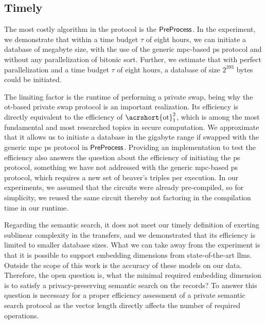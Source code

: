 \subsection*{\thesubsection\quad Timely}\label{subsec:DiscussionTimely}

The most costly algorithm in the protocol is the $ \mathsf{{PreProcess}} $. In the experiment, we demonstrate that within a time budget $ \tau $ of eight hours, we can initiate a database of megabyte size, with the use of the generic \acrshort{mpc}-based \acrshort{ps} protocol and without any parallelization of bitonic sort. Further, we estimate that with perfect parallelization and a time budget $ \tau $ of eight hours, a database of size $ 2^{393} $ bytes could be initiated. 

The limiting factor is the runtime of performing a private swap, being why the \acrshort{ot}-based private swap protocol is an important realization. Its efficiency is directly equivalent to the efficiency of $\text{\acrshort{ot}}^2_1$, which is among the most fundamental and most researched topics in secure computation. We approximate that it allows us to initiate a database in the gigabyte range if swapped with the generic \acrshort{mpc} \acrshort{ps} protocol in $ \mathsf{{PreProcess}} $. Providing an implementation to test the efficiency also answers the question about the efficiency of initiating the \acrshort{ps} protocol, something we have not addressed with the generic \acrshort{mpc}-based \acrshort{ps} protocol, which requires a new set of beaver's triples per execution. In our experiments, we assumed that the circuits were already pre-compiled, so for simplicity, we reused the same circuit thereby not factoring in the compilation time in our runtime. 

Regarding the semantic search, it does not meet our timely definition of exerting sublinear complexity in the transfers, and we demonstrated that its efficiency is limited to smaller database sizes. What we can take away from the experiment is that it is possible to support embedding dimensions from state-of-the-art \acrshort{llm}s. Outside the scope of this work is the accuracy of these models on our data. Therefore, the open question is, what the minimal required embedding dimension is to satisfy a privacy-preserving semantic search on the records? To answer this question is necessary for a proper efficiency assessment of a private semantic search protocol as the vector length directly affects the number of required operations.
